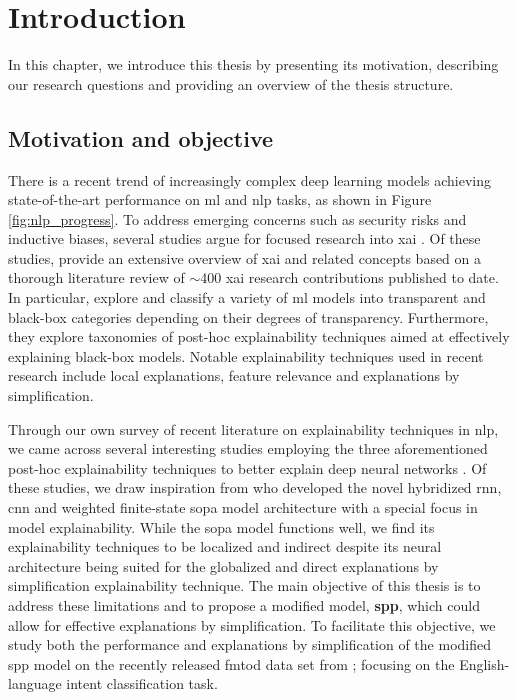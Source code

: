 \chapter{Introduction}

\label{chapter:introduction}

In this chapter, we introduce this thesis by presenting its motivation,
describing our research questions and providing an overview of the thesis
structure.

\section{Motivation and objective}

There is a recent trend of increasingly complex deep learning models achieving
state-of-the-art performance on \ac{ml} and \ac{nlp} tasks, as shown in Figure
\ref{fig:nlp_progress}. To address emerging concerns such as security risks and
inductive biases, several studies argue for focused research into \ac{xai}
\citep{doran2017does,townsend2019extracting,danilevsky2020survey,arrieta2020explainable}.
Of these studies, \citet{arrieta2020explainable} provide an extensive overview
of \ac{xai} and related concepts based on a thorough literature review of
$\sim$400 \ac{xai} research contributions published to date. In particular,
\citet{arrieta2020explainable} explore and classify a variety of \ac{ml} models
into transparent and black-box categories depending on their degrees of
transparency. Furthermore, they explore taxonomies of post-hoc explainability
techniques aimed at effectively explaining black-box models. Notable
explainability techniques used in recent research include local explanations,
feature relevance and explanations by simplification.

Through our own survey of recent literature on explainability techniques in
\ac{nlp}, we came across several interesting studies employing the three
aforementioned post-hoc explainability techniques to better explain deep neural networks
\citep{schwartz2018sopa,peng2018rational,suresh-etal-2019-distilling,wang2019state,jiang2020cold}.
Of these studies, we draw inspiration from \citet{schwartz2018sopa} who
developed the novel hybridized \ac{rnn}, \ac{cnn} and weighted finite-state
\ac{sopa} model architecture with a special focus in model explainability. While
the \ac{sopa} model functions well, we find its explainability techniques to be
localized and indirect despite its neural architecture being suited for the
globalized and direct explanations by simplification explainability technique.
The main objective of this thesis is to address these limitations and to propose
a modified model, \textbf{\ac{spp}}, which could allow for effective explanations
by simplification. To facilitate this objective, we study both the performance and
explanations by simplification of the modified \ac{spp} model on the recently
released \ac{fmtod} data set from \citet{schuster-etal-2019-cross-lingual};
focusing on the English-language intent classification task.

